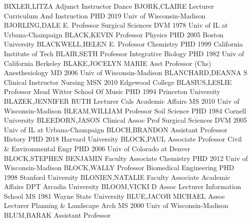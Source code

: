 \documentclass[
]{article}
\begin{document}
\textbar BIXLER,LITZA \textbar{}  \textbar Adjunct Instructor
\textbar Dance \textbar BJORK,CLAIRE \textbar Lecturer \textbar{}
 \textbar Curriculum And Instruction \textbar PHD 2019 Univ
of Wisconsin-Madison \textbar BJORLING,DALE E. \textbar Professor
\textbar{}  \textbar Surgical Sciences \textbar DVM 1978 Univ
of IL at Urbana-Champaign \textbar BLACK,KEVIN \textbar Professor
\textbar{}  \textbar Physics \textbar PHD 2005 Boston
University \textbar BLACKWELL,HELEN E. \textbar Professor \textbar{}
 \textbar Chemistry \textbar PHD 1999 California Institute of
Tech \textbar BLAIR,SETH \textbar Professor \textbar{} 
\textbar Integrative Biology \textbar PHD 1982 Univ of California
Berkeley \textbar BLAKE,JOCELYN MARIE \textbar Asst Professor (Chs)
\textbar{}  \textbar Anesthesiology \textbar MD 2006 Univ of
Wisconsin-Madison \textbar BLANCHARD,DEANNA S \textbar Clinical
Instructor \textbar{}  \textbar Nursing \textbar MSN 2010
Edgewood College \textbar BLASIUS,LESLIE \textbar Professor \textbar{}
 \textbar Mead Witter School Of Music \textbar PHD 1994
Princeton University \textbar BLAZEK,JENNIFER RUTH \textbar Lecturer
\textbar{}  \textbar Cals Academic Affairs \textbar MS 2010
Univ of Wisconsin-Madison \textbar BLEAM,WILLIAM \textbar Professor
\textbar{}  \textbar Soil Science \textbar PHD 1984 Cornell
University \textbar BLEEDORN,JASON \textbar Clinical Assoc Prof
\textbar{}  \textbar Surgical Sciences \textbar DVM 2005 Univ
of IL at Urbana-Champaign \textbar BLOCH,BRANDON \textbar Assistant
Professor \textbar{}  \textbar History \textbar PHD 2018
Harvard University \textbar BLOCK,PAUL \textbar Associate Professor
\textbar{}  \textbar Civil \& Environmental Engr \textbar PHD
2006 Univ of Colorado at Denver \textbar BLOCK,STEPHEN BENJAMIN
\textbar Faculty Associate \textbar{}  \textbar Chemistry
\textbar PHD 2012 Univ of Wisconsin-Madison \textbar BLOCK,WALLY
\textbar Professor \textbar{}  \textbar Biomedical
Engineering \textbar PHD 1998 Stanford University
\textbar BLONIEN,NATALIE \textbar Faculty Associate \textbar{}
 \textbar Academic Affairs \textbar DPT Arcadia University
\textbar BLOOM,VICKI D \textbar Assoc Lecturer \textbar{} 
\textbar Information School \textbar MS 1981 Wayne State University
\textbar BLUE,JACOB MICHAEL \textbar Assoc Lecturer \textbar{}
 \textbar Planning \& Landscape Arch \textbar MS 2000 Univ of
Wisconsin-Madison \textbar BLUM,BARAK \textbar Assistant Professor
\end{document}
